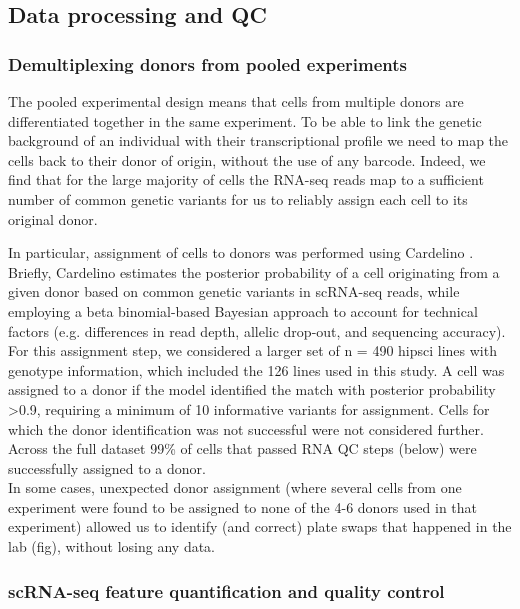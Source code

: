 \subsection{Data processing and QC}

\subsubsection{Demultiplexing donors from pooled experiments} 

The pooled experimental design means that cells from multiple donors are differentiated together in the same experiment. 
To be able to link the genetic background of an individual with their transcriptional profile we need to map the cells back to their donor of origin, without the use of any barcode.
Indeed, we find that for the large majority of cells the RNA-seq reads map to a sufficient number of common genetic variants for us to reliably assign each cell to its original donor.

In particular, assignment of cells to donors was performed using Cardelino \cite{mccarthy2020cardelino}. 
Briefly, Cardelino estimates the posterior probability of a cell originating from a given donor based on common genetic variants in scRNA-seq reads, while employing a beta binomial-based Bayesian approach to account for technical factors (e.g. differences in read depth, allelic drop-out, and sequencing accuracy). 
For this assignment step, we considered a larger set of n = 490 \gls{hipsci} lines with genotype information, which included the 126 lines used in this study. 
A cell was assigned to a donor if the model identified the match with posterior probability >0.9, requiring a minimum of 10 informative variants for assignment. 
Cells for which the donor identification was not successful were not considered further.
Across the full dataset 99\% of cells that passed RNA QC steps (below) were successfully assigned to a donor.\\


In some cases, unexpected donor assignment (where several cells from one experiment were found to be assigned to none of the 4-6 donors used in that experiment) allowed us to identify (and correct) plate swaps that happened in the lab (fig), without losing any data.

\subsubsection{scRNA-seq feature quantification and quality control}

